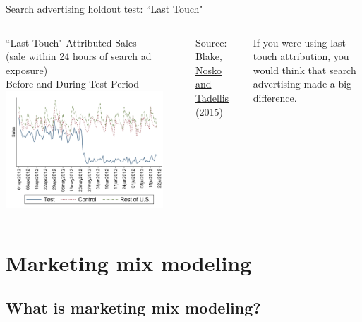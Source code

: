 \documentclass[10pt, aspectratio=169]{beamer}
\newcommand{\source}[1]{\begin{flushright} \footnotesize Source: {#1} \end{flushright} \normalsize}
\begin{document}
\begin{frame}{Search advertising holdout test: ``Last Touch"}
\begin{columns}[t]
\centering
``Last Touch" Attributed Sales \\
(sale within 24 hours of search ad exposure)\\
Before and During Test Period\\
\includegraphics[width=0.9\textwidth]{images/blakeetallasttouch.png}\\
\source{\href{https://github.com/eleafeit/ad_response_tutorial/blob/master/Papers/BlakeNoskoTadelis2015ConsumerHeterogeneityandPaidSearchEffectiveness.pdf}{Blake, Nosko and Tadellis (2015)}}
\alert{If you were using last touch attribution, you would think that search advertising made a big difference.}
\end{columns}
\end{frame}

\section{Marketing mix modeling}

\subsection{What is marketing mix modeling?}
\end{document}
